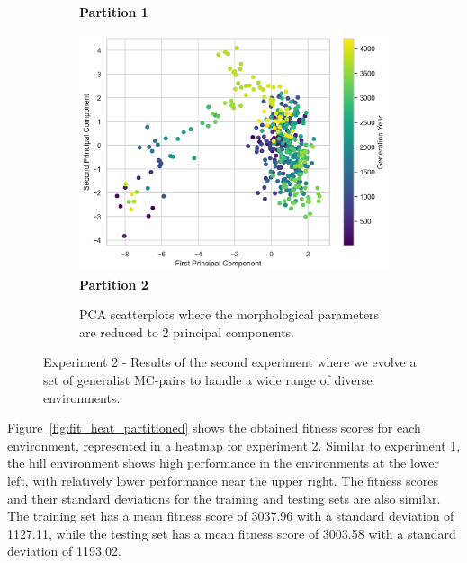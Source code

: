 \begin{figure}[!htp]
\begin{subfigure}{\textwidth}
\begin{minipage}{0.32\textwidth}
                    \textbf{Partition 1}
                \end{minipage}
                \hfill
                \begin{minipage}{0.32\textwidth}
                    \centering
                    \includegraphics[width=\linewidth]{resources/partition_5_2906_3/partition_2/pca_scatterplot.png}
                    \textbf{Partition 2}
                \end{minipage}
                \caption{PCA scatterplots where the morphological parameters are reduced to 2 principal components.}
                \label{fig:pca_partition}
            \end{subfigure}

            \caption{Experiment 2 - Results of the second experiment where we evolve a set of generalist MC-pairs to handle a wide range of diverse environments.}
            \label{fig:experiment2}
        \end{figure}

        Figure~\ref{fig:fit_heat_partitioned} shows the obtained fitness scores for each environment, represented in a heatmap for experiment 2. Similar to experiment 1, the hill environment shows high performance in the environments at the lower left, with relatively lower performance near the upper right. The fitness scores and their standard deviations for the training and testing sets are also similar. The training set has a mean fitness score of 3037.96 with a standard deviation of 1127.11, while the testing set has a mean fitness score of 3003.58 with a standard deviation of 1193.02. 

